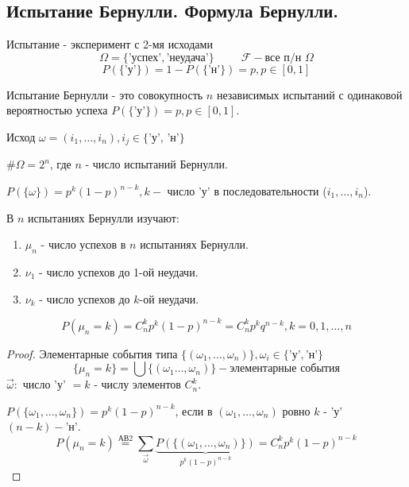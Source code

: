 \subsection{Испытание Бернулли. Формула Бернулли.}

\begin{definition}[Испытание]
	Испытание - эксперимент с 2-мя исходами
	\[ \Omega = \{\text{'успех'}, \text{'неудача'}\} ~~~~~~~~~~~ \mathcal{F} - \text{все п/н } \Omega \]
	\[ P(\{\text{'у'}\}) = 1 - P(\{\text{'н'}\}) = p, p \in [0,1] \]
\end{definition}

\begin{definition}
	Испытание Бернулли - это совокупность $n$ независимых испытаний с одинаковой вероятностью успеха $P(\{\text{'у'}\}) = p, p \in [0,1]$.
	
	\noindent Исход $\omega = (i_1, \dots, i_n), i_j \in \{\text{'у', 'н'}\}$
	
	\noindent $\# \Omega = 2^n$, где $n$ - число испытаний Бернулли.
	
	\noindent $P(\{\omega\}) = p^k(1-p)^{n-k}, k - $ число 'у' в последовательности ($i_1, \dots, i_n$).
\end{definition}

В $n$ испытаниях Бернулли изучают:
\begin{enumerate}
	\item $\mu_n$ - число успехов в $n$ испытаниях Бернулли.
	\item $\nu_1$ - число успехов до 1-ой неудачи.
	\item $\nu_k$ - число успехов до $k$-ой неудачи.
\end{enumerate}

\begin{definition}
	\[ P(\mu_n = k) = C_n^kp^k(1-p)^{n-k} = C_n^k p^k q^{n-k}, k = 0,1, \dots, n \]
	
	\begin{proof}
		Элементарные события типа $\{ (\omega_1, \dots, \omega_n) \}, \omega_i \in \{ \text{'у'}, \text{'н'} \}$
		\[ \{\mu_n = k\} = \bigcup \{(\omega_1 \dots, \omega_n)\} - \text{элементарные события} \]
		$\vec{\omega}:$ число 'у' $=k$ - числу элементов $C_n^k$.
		
		$P(\{ \omega_1, \dots, \omega_n \}) = p^k (1-p)^{n-k}$, если в $(\omega_1, \dots, \omega_n)$ ровно $k$ - 'у' $(n-k)-\text{'н'}$.
		\[ P(\mu_n = k) \stackrel{\text{АВ2}}{=} \sum\limits_{\vec{\omega}} \underbrace{P(\{(\omega_1, \dots, \omega_n)\})}_{p^k(1-p)^{n-k}} = C_n^k p^k (1-p)^{n-k} \]
	\end{proof}
\end{definition}

